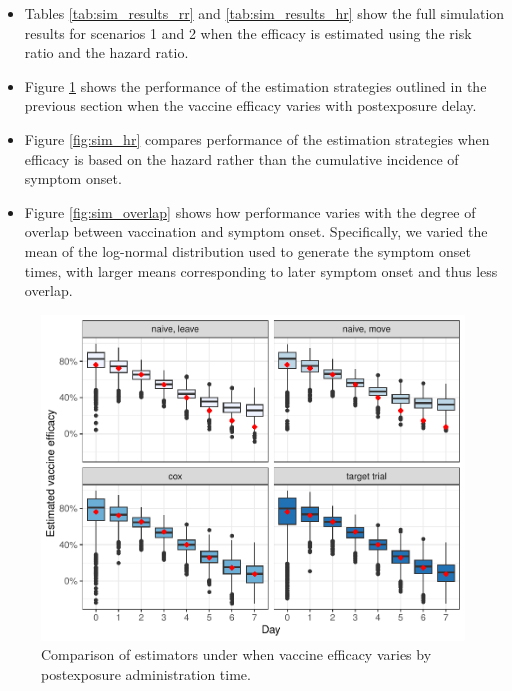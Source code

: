 \begin{appendix}
    \begin{itemize}
        \item Tables \ref{tab:sim_results_rr} and \ref{tab:sim_results_hr} show the full simulation results for scenarios 1 and 2 when the efficacy is estimated using the risk ratio and the hazard ratio.
        \item Figure \ref{fig:sim_hetx} shows the performance of the estimation strategies outlined in the previous section when the vaccine efficacy varies with postexposure delay. 
        \item Figure \ref{fig:sim_hr} compares performance of the estimation strategies when efficacy is based on the hazard rather than the cumulative incidence of symptom onset.
        \item Figure \ref{fig:sim_overlap} shows how performance varies with the degree of overlap between vaccination and symptom onset. Specifically, we varied the mean of the log-normal distribution used to generate the symptom onset times, with larger means corresponding to later symptom onset and thus less overlap.
    \end{itemize}

    \begin{table}[p]
        \centering
        \caption{Simulation results for scenarios 1 and 2 when estimating VE using risk ratio}\label{tab:sim_results_rr}
        
    \end{table}

    \begin{table}[p]
        \centering
        \caption{Simulation results for scenarios 1 and 2 when estimating VE using hazard ratio}\label{tab:sim_results_hr}
        
    \end{table}

    \clearpage

    \begin{figure}[p]
        \centering
        \includegraphics{../3_figures/sim_hetx.pdf}
        \caption{Comparison of estimators under when vaccine efficacy varies by postexposure administration time.\label{fig:sim_hetx}}
    \end{figure}


\end{appendix}
